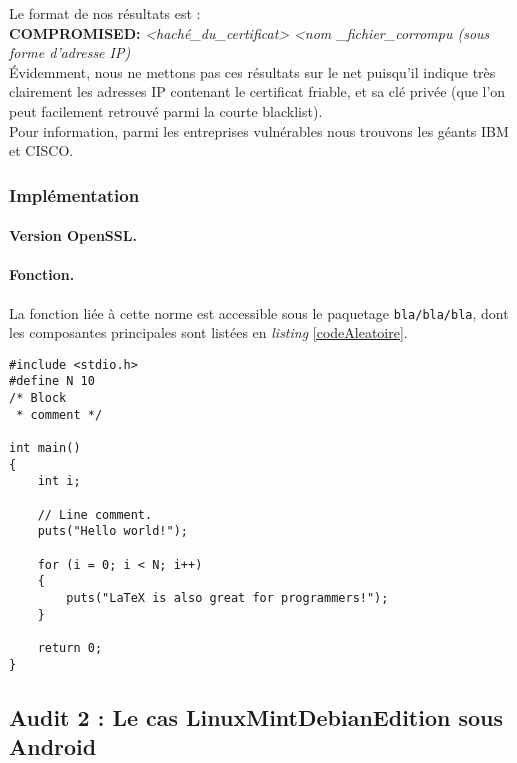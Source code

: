 			Le format de nos résultats est : \\
			
			\textbf{COMPROMISED:} \textit{<haché\_du\_certificat>} \textit{<nom
			\_fichier\_corrompu (sous forme d'adresse IP)}\\
			
			Évidemment, nous ne mettons pas ces résultats sur le net puisqu'il indique 
			très clairement les adresses IP contenant le certificat friable, et sa clé
			privée (que l'on peut facilement retrouvé parmi la courte blacklist).\\
			
			Pour information, parmi les entreprises vulnérables nous trouvons les géants
			IBM et CISCO.
	
		\subsubsection{Implémentation}
			
			\paragraph{Version OpenSSL.\\}
			
			\paragraph{Fonction.\\}
			La fonction liée à cette norme est accessible sous le paquetage \texttt{bla/bla/bla}, 
			dont les composantes principales sont listées en \textit{listing} \ref{codeAleatoire}.
			
			
			\begin{lstlisting}[style=customc,caption=codeAleatoire.c, label=codeAleatoire]
#include <stdio.h>
#define N 10
/* Block
 * comment */
 
int main()
{
    int i;
 
    // Line comment.
    puts("Hello world!");
 
    for (i = 0; i < N; i++)
    {
        puts("LaTeX is also great for programmers!");
    }
 
    return 0;
}
		\end{lstlisting}
		

	\subsection{Audit 2 : Le cas LinuxMintDebianEdition sous Android}
